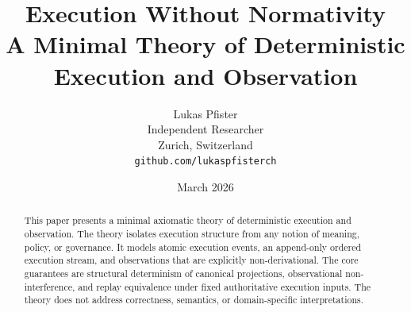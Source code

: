 \documentclass[11pt]{article}
\title{Execution Without Normativity\\\large A Minimal Theory of Deterministic Execution and Observation}
\author{Lukas Pfister\\Independent Researcher\\Zurich, Switzerland\\\texttt{github.com/lukaspfisterch}}
\date{March 2026}
\begin{document}
\maketitle

\begin{abstract}
This paper presents a minimal axiomatic theory of deterministic execution and observation. The theory isolates execution structure from any notion of meaning, policy, or governance. It models atomic execution events, an append-only ordered execution stream, and observations that are explicitly non-derivational. The core guarantees are structural determinism of canonical projections, observational non-interference, and replay equivalence under fixed authoritative execution inputs. The theory does not address correctness, semantics, or domain-specific interpretations.
\end{abstract}














\end{document}
